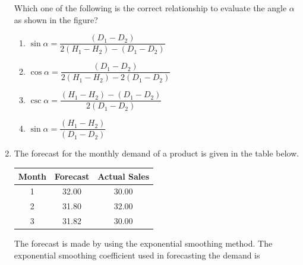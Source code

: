 \documentclass[12pt,onecolumn]{article}
\begin{document}
\begin{enumerate}
          Which one of the following is the correct relationship to evaluate the angle $\alpha$ as shown in the figure?
          \begin{enumerate}
              \item $\sin\alpha = \dfrac{(D_1-D_2)}{2(H_1-H_2)-(D_1-D_2)}$
              \item $\cos\alpha = \dfrac{(D_1-D_2)}{2(H_1-H_2)-2(D_1-D_2)}$
              \item $\csc\alpha = \dfrac{(H_1-H_2)-(D_1-D_2)}{2(D_1-D_2)}$
              \item $\sin\alpha = \dfrac{(H_1-H_2)}{(D_1-D_2)}$
          \end{enumerate}

    \item The forecast for the monthly demand of a product is given in the table below.

          \begin{table}[H]
              \centering
              \begin{tabular}{|c|c|c|}
                  \hline
                  \textbf{Month} & \textbf{Forecast} & \textbf{Actual Sales} \\\hline
                  1              & 32.00             & 30.00                 \\\hline
                  2              & 31.80             & 32.00                 \\\hline
                  3              & 31.82             & 30.00                 \\\hline
              \end{tabular}
              \label{tab:q33}
          \end{table}

          The forecast is made by using the exponential smoothing method. The exponential smoothing coefficient used in forecasting the demand is
          \begin{enumerate}
          \end{enumerate}


\end{enumerate}
\end{document}
